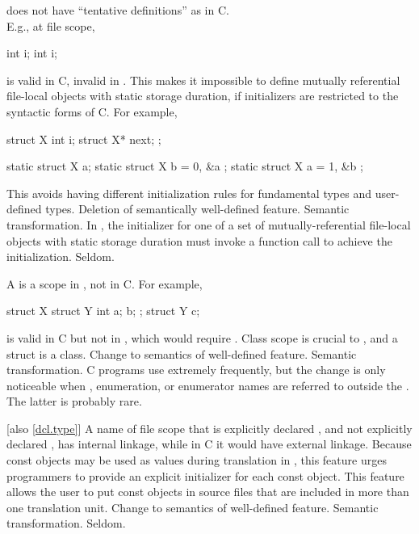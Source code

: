 \change
\Cpp{} does not have ``tentative definitions'' as in C.\\
E.g., at file scope,
\begin{codeblock}
int i;
int i;
\end{codeblock}
is valid in C, invalid in \Cpp{}.
This makes it impossible to define
mutually referential file-local objects with static storage duration,
if initializers are restricted to the syntactic forms of C\@.
For example,
\begin{codeblock}
struct X { int i; struct X* next; };

static struct X a;
static struct X b = { 0, &a };
static struct X a = { 1, &b };
\end{codeblock}

\rationale
This avoids having different initialization rules for
fundamental types and user-defined types.
\effect
Deletion of semantically well-defined feature.
\difficulty
Semantic transformation.
In \Cpp{}, the initializer for one of a set of
mutually-referential file-local objects with static storage
duration must invoke a function
call to achieve the initialization.
\howwide
Seldom.

\change
A  is a scope in \Cpp{}, not in C.
For example,
\begin{codeblock}
struct X {
  struct Y { int a; } b;
};
struct Y c;
\end{codeblock}
is valid in C but not in \Cpp{}, which would require .
\rationale
Class scope is crucial to \Cpp{}, and a struct is a class.
\effect
Change to semantics of well-defined feature.
\difficulty
Semantic transformation.
\howwide
C programs use  extremely frequently, but the
change is only noticeable when , enumeration, or enumerator
names are referred to outside the .
The latter is probably rare.

 [also \ref{dcl.type}]
\change
A name of file scope that is explicitly declared , and not explicitly
declared , has internal linkage, while in C it would have external linkage.
\rationale
Because const objects may be used as values during translation in
\Cpp{}, this feature urges programmers to provide an explicit initializer
for each const object.
This feature allows the user to put const objects in source files that are included
in more than one translation unit.
\effect
Change to semantics of well-defined feature.
\difficulty
Semantic transformation.
\howwide
Seldom.

